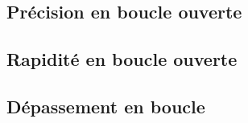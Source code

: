 \subsection{Précision en boucle ouverte}

\subsection{Rapidité en boucle ouverte}

\subsection{Dépassement en boucle }








